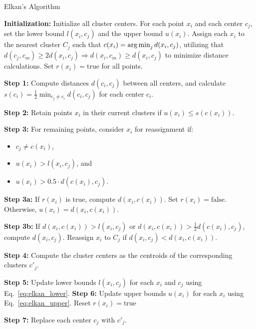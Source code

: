\begin{algorithm}[h]
	\caption{Elkan's Algorithm}
	\label{alg:elkan}
	\begin{algorithmic}
		\State \textbf{Initialization:} Initialize all cluster centers. For each point $x_i$ and each center $c_j$, set the lower bound $l(x_i,c_j)$ and the upper bound $u(x_i)$. Assign each $x_i$ to the nearest cluster $C_j$ such that $c(x_i) = \operatorname*{arg\,min}_j d(x_i, c_j)$, utilizing that
		$ d(c_j, c_m) \geq 2d(x_i, c_j) \Rightarrow d(x_i, c_m) \geq d(x_i, c_j) $
		to minimize distance calculations. Set $r(x_i) = \text{true}$ for all points.

		\Repeat
		\State \textbf{Step 1:} Compute distances $d(c_i, c_j)$ between all centers, and calculate $s(c_i) = \frac{1}{2} \min_{c_j \neq c_i} d(c_i, c_j)$ for each center $c_i$.

		\State \textbf{Step 2:} Retain points $x_i$ in their current clusters if $u(x_i) \leq s(c(x_i))$.

		\State \textbf{Step 3:} For remaining points, consider $x_i$ for reassignment if:
		\begin{itemize}[leftmargin=5em,itemindent=\algorithmicindent,itemsep=0pt,parsep=0pt]
			\item $c_j \neq c(x_i)$,
			\item $u(x_i) > l(x_i, c_j)$, and
			\item $u(x_i) > 0.5 \cdot d(c(x_i), c_j)$.
		\end{itemize}

		\State \textbf{Step 3a:} If $r(x_i)$ is true, compute $d(x_i, c(x_i))$. Set $r(x_i) = \text{false}$. Otherwise, $u(x_i) = d(x_i, c(x_i))$.

		\State \textbf{Step 3b:} If $d(x_i, c(x_i)) > l(x_i, c_j)$ or $d(x_i, c(x_i)) > \frac{1}{2}d(c(x_i), c_j)$, compute $d(x_i, c_j)$. Reassign $x_i$ to $C_j$ if $d(x_i, c_j) < d(x_i, c(x_i))$.

		\State \textbf{Step 4:} Compute the cluster centers as the centroids of the corresponding clusters $c'_j$.

		\State \textbf{Step 5:} Update lower bounds $l(x_i, c_j)$ for each $x_i$ and $c_j$ using Eq.~\ref{eq:elkan_lower}.
		\State \textbf{Step 6:} Update upper bounds $u(x_i)$ for each $x_i$ using Eq.~\ref{eq:elkan_upper}. Reset $r(x_i) = \text{true}$

		\State \textbf{Step 7:} Replace each center $c_j$ with $c'_j$.
	\end{algorithmic}
\end{algorithm}


